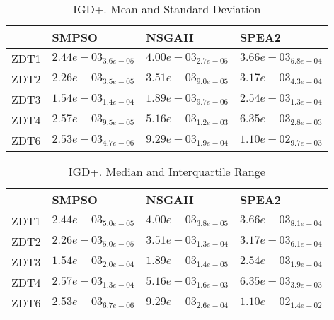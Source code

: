 \documentclass{article}
\begin{document}
\begin{table}
\caption{IGD+. Mean and Standard Deviation}
\label{table: IGD+}
\centering
\begin{scriptsize}
\begin{tabular}{llll}
\hline & SMPSO & NSGAII &  SPEA2\\
\hline 
ZDT1 & \cellcolor{gray95}$  2.44e-03_{ 3.6e-05}$ & $  4.00e-03_{ 2.7e-05}$ & \cellcolor{gray25}$  3.66e-03_{ 5.8e-04}$ \\
ZDT2 & \cellcolor{gray95}$  2.26e-03_{ 3.5e-05}$ & $  3.51e-03_{ 9.0e-05}$ & \cellcolor{gray25}$  3.17e-03_{ 4.3e-04}$ \\
ZDT3 & \cellcolor{gray95}$  1.54e-03_{ 1.4e-04}$ & \cellcolor{gray25}$  1.89e-03_{ 9.7e-06}$ & $  2.54e-03_{ 1.3e-04}$ \\
ZDT4 & \cellcolor{gray95}$  2.57e-03_{ 9.5e-05}$ & \cellcolor{gray25}$  5.16e-03_{ 1.2e-03}$ & $  6.35e-03_{ 2.8e-03}$ \\
ZDT6 & \cellcolor{gray95}$  2.53e-03_{ 4.7e-06}$ & \cellcolor{gray25}$  9.29e-03_{ 1.9e-04}$ & $  1.10e-02_{ 9.7e-03}$ \\
\hline
\end{tabular}
\end{scriptsize}
\end{table}

\begin{table}
\caption{IGD+. Median and Interquartile Range}
\label{table: IGD+}
\centering
\begin{scriptsize}
\begin{tabular}{llll}
\hline & SMPSO & NSGAII &  SPEA2\\
\hline 
ZDT1 & \cellcolor{gray95}$  2.44e-03_{ 5.0e-05}$ & $  4.00e-03_{ 3.8e-05}$ & \cellcolor{gray25}$  3.66e-03_{ 8.1e-04}$ \\
ZDT2 & \cellcolor{gray95}$  2.26e-03_{ 5.0e-05}$ & $  3.51e-03_{ 1.3e-04}$ & \cellcolor{gray25}$  3.17e-03_{ 6.1e-04}$ \\
ZDT3 & \cellcolor{gray95}$  1.54e-03_{ 2.0e-04}$ & \cellcolor{gray25}$  1.89e-03_{ 1.4e-05}$ & $  2.54e-03_{ 1.9e-04}$ \\
ZDT4 & \cellcolor{gray95}$  2.57e-03_{ 1.3e-04}$ & \cellcolor{gray25}$  5.16e-03_{ 1.6e-03}$ & $  6.35e-03_{ 3.9e-03}$ \\
ZDT6 & \cellcolor{gray95}$  2.53e-03_{ 6.7e-06}$ & \cellcolor{gray25}$  9.29e-03_{ 2.6e-04}$ & $  1.10e-02_{ 1.4e-02}$ \\
\hline
\end{tabular}
\end{scriptsize}
\end{table}
\end{document}
